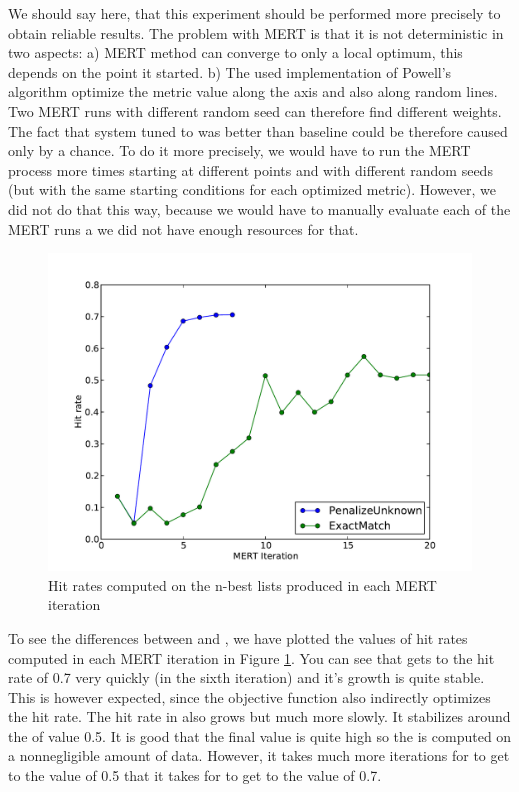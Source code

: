 We should say here, that this experiment should be performed more precisely to
obtain reliable results. The problem with MERT is that it is not
deterministic in two aspects: a) MERT method can converge to only a local
optimum, this depends on the point it started. b) The used implementation of
Powell's algorithm optimize the metric value along the axis and also along
random lines. Two MERT runs with different random seed can therefore find
different weights. The fact that system tuned to  was
better than baseline could be therefore caused only by a chance. To do it more
precisely, we would have to run the MERT process more times starting at
different points and with different random seeds (but with the same starting
conditions for each optimized metric). However, we did not do that this way,
because we would have to manually evaluate each of the MERT runs a we did not
have enough resources for that.





\begin{figure}
    \begin{center}
        \includegraphics[width=12cm]{img/hit-rates-plot.pdf}
    \end{center}

    \caption[Hit rates computed on the n-best lists produced in MERT]{Hit rates
    computed on the n-best lists produced in each MERT iteration}

    \label{hit:rates:plot}
\end{figure}


To see the differences between  and
, we have plotted the values of hit rates computed in
each MERT iteration in Figure \ref{hit:rates:plot}. You can see that
 gets to the hit rate of 0.7 very quickly (in the sixth
iteration) and it's growth is quite stable. This is however expected, since the
objective function also indirectly optimizes the hit rate. The hit rate in
 also grows but much more slowly. It stabilizes around the of
value 0.5. It is good that the final value is quite high so the
 is computed on a nonnegligible amount of data. However, it
takes much more iterations for  to get to the value of 0.5 that
it takes for  to get to the value of 0.7. 

